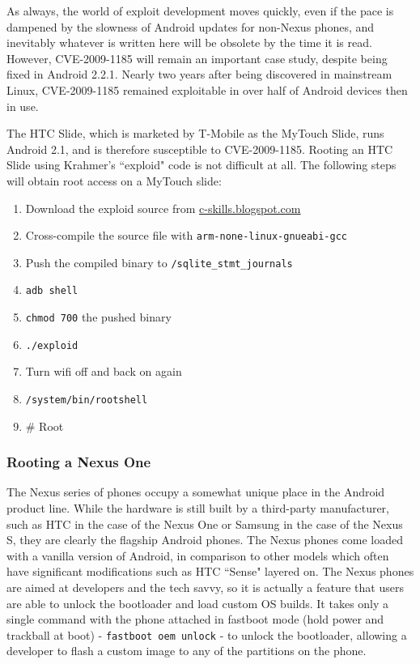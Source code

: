 As always, the world of exploit development moves quickly, even if the pace is dampened by the slowness of Android updates for
non-Nexus phones, and inevitably whatever is written here will be obsolete by the time it is read.  However, CVE-2009-1185 will
remain an important case study, despite being fixed in Android 2.2.1.  Nearly two years after being discovered in mainstream Linux,
CVE-2009-1185 remained exploitable in over half of Android devices then in use.

The HTC Slide, which is marketed by T-Mobile as the MyTouch Slide, runs Android 2.1, and is therefore susceptible to CVE-2009-1185. 
Rooting an HTC Slide using Krahmer's ``exploid" code is not difficult at all. The following steps will obtain root access on a
MyTouch slide: 

\begin{enumerate}
	\item Download the exploid source from \url{c-skills.blogspot.com}
	\item Cross-compile the source file with \texttt{arm-none-linux-gnueabi-gcc}
	\item Push the compiled binary to \texttt{/sqlite\_stmt\_journals}
	\item \texttt{adb shell}
	\item \texttt{chmod 700} the pushed binary
	\item \texttt{./exploid}
	\item Turn wifi off and back on again
	\item \texttt{/system/bin/rootshell}
	\item {\# Root}
\end{enumerate}

\subsubsection{Rooting a Nexus One}

The Nexus series of phones occupy a somewhat unique place in the Android product line.  While the hardware is still built by a
third-party manufacturer, such as HTC in the case of the Nexus One or Samsung in the case of the Nexus S, they are clearly the
flagship Android phones.  The Nexus phones come loaded with a vanilla version of Android, in comparison to other models which often
have significant modifications such as HTC ``Sense" layered on.  The Nexus phones are aimed at developers and the tech savvy, so it
is actually a feature that users are able to unlock the bootloader and load custom OS builds.  It takes only a single command with
the phone attached in fastboot mode (hold power and trackball at boot) - \texttt{fastboot oem unlock} - to unlock the bootloader,
allowing a developer to flash a custom image to any of the partitions on the phone.

